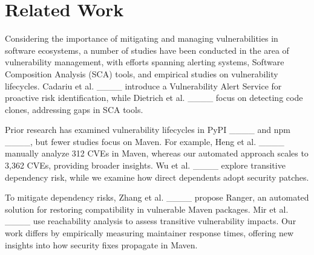 \section{Related Work}
Considering the importance of mitigating and managing vulnerabilities in software ecosystems, a number of studies have been conducted in the area of vulnerability management, with efforts spanning alerting systems, Software Composition Analysis (SCA) tools, and empirical studies on vulnerability lifecycles. Cadariu et al. ____ introduce a Vulnerability Alert Service for proactive risk identification, while Dietrich et al. ____ focus on detecting code clones, addressing gaps in SCA tools.

Prior research has examined vulnerability lifecycles in PyPI ____ and npm ____, but fewer studies focus on Maven. For example, Heng et al. ____ manually analyze 312 CVEs in Maven, whereas our automated approach scales to 3,362 CVEs, providing broader insights. Wu et al. ____ explore transitive dependency risk, while we examine how direct dependents adopt security patches.

To mitigate dependency risks, Zhang et al. ____ propose Ranger, an automated solution for restoring compatibility in vulnerable Maven packages. Mir et al. ____ use reachability analysis to assess transitive vulnerability impacts. Our work differs by empirically measuring maintainer response times, offering new insights into how security fixes propagate in Maven.
